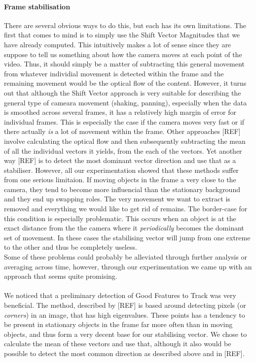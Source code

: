 \paragraph{Frame stabilisation}
%
There are several obvious ways to do this, but each has its own limitations. The first that comes to mind is to simply use the Shift Vector Magnitudes that we have already computed. This intuitively makes a lot of sense since they are suppose to tell us something about how the camera moves at each point of the video. Thus, it should simply be a matter of subtracting this general movement from whatever individial movement is detected within the frame and the remaining movement would be the optical flow of the content. However, it turns out that although the Shift Vector approach is very suitable for describing the general type of cameara movement (shaking, panning), especially when the data is smoothed across several frames, it has a relatively high margin of error for individual frames. This is especially the case if the camera moves very fast or if there actually \textit{is} a lot of movement within the frame. Other approaches [REF] involve calculating the optical flow and then subsequently subtracting the mean of all the individual vectors it yields, from the each of the vectors.
%
%
Yet another way [REF] is to detect the most dominant vector direction and use that as a stabiliser. However, all our experimentation showed that these methods suffer from one serious limitaion. If moving objects in the frame a very close to the camera, they tend to become more influencial than the stationary background and they end up swapping roles. The very movement we want to extract is removed and everything we would like to get rid of remains. The border-case for this condition is especially problematic. This occurs when an object is at the exact distance from the the camera where it \textit{periodically} becomes the dominant set of movement. In these cases the stabilising vector will jump from one extreme to the other and thus be completely useless.\\
Some of these problems could probably be alleviated through further analysis or averaging across time, however, through our experimentation we came up with an approach that seems quite promising.\\\\
%
We noticed that a preliminary detection of Good Features to Track was very beneficial. The method, described by [REF] is based around detecting pixels (or \textit{corners}) in an image, that has high eigenvalues.
%
%
These points has a tendency to be present in stationary objects in the frame far more often than in moving objects, and thus form a very decent base for our stabilising vector. We chose to calculate the mean of these vectors and use that, although it also would be possible to detect the most common direction as described above and in [REF].
%
